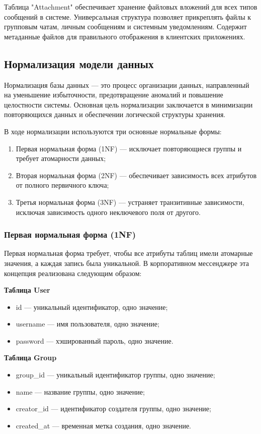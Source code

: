 Таблица "Attachment" обеспечивает хранение файловых вложений для всех типов сообщений в системе. Универсальная структура позволяет прикреплять файлы к групповым чатам, личным сообщениям и системным уведомлениям. Содержит метаданные файлов для правильного отображения в клиентских приложениях.

\subsection{Нормализация модели данных}

Нормализация базы данных — это процесс организации данных, направленный на уменьшение избыточности, предотвращение аномалий и повышение целостности системы. Основная цель нормализации заключается в минимизации повторяющихся данных и обеспечении логической структуры хранения. 

В ходе нормализации используются три основные нормальные формы:
\begin{enumerate}
	\item Первая нормальная форма (1NF) — исключает повторяющиеся группы и требует атомарности данных;
	\item Вторая нормальная форма (2NF) — обеспечивает зависимость всех атрибутов от полного первичного ключа;
	\item Третья нормальная форма (3NF) — устраняет транзитивные зависимости, исключая зависимость одного неключевого поля от другого.
\end{enumerate}

\subsubsection{Первая нормальная форма (1NF)}

Первая нормальная форма требует, чтобы все атрибуты таблиц имели атомарные значения, а каждая запись была уникальной. В корпоративном мессенджере эта концепция реализована следующим образом:

\textbf{Таблица User}  
\begin{itemize}
	\item id — уникальный идентификатор, одно значение;
	\item username — имя пользователя, одно значение;
	\item password — хэшированный пароль, одно значение.
\end{itemize}

\textbf{Таблица Group}  
\begin{itemize}
	\item group\_id — уникальный идентификатор группы, одно значение;
	\item name — название группы, одно значение;
	\item creator\_id — идентификатор создателя группы, одно значение;
	\item created\_at — временная метка создания, одно значение.
\end{itemize}

